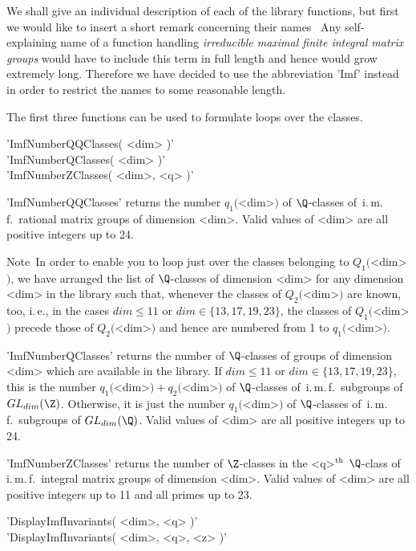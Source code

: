 We shall give an individual description of each of the library functions,
but first we would like to insert a short remark concerning their names\:
\  Any self-explaining  name   of  a function handling  {\em  irreducible
maximal finite integral matrix groups} would have to include this term in
full length  and hence would   grow extremely  long.  Therefore we   have
decided to use  the abbreviation 'Imf' instead in  order  to restrict the
names to some reasonable length.

The  first  three  functions can   be  used to formulate  loops  over the
classes.

\vspace{5mm}
'ImfNumberQQClasses( <dim> )'%
 \\
'ImfNumberQClasses( <dim> )'%
 \\
'ImfNumberZClasses( <dim>, <q> )'%

'ImfNumberQQClasses'  returns the  number  $q_1($<dim>$)$ of $\Q$-classes
of\, i.\,m.\,f.~rational  matrix groups of  dimension <dim>. Valid values
of <dim> are all positive integers up to 24.

Note\:\ In order to enable you to loop just over the classes belonging to
$Q_1($<dim>$)$, we have  arranged the list  of $\Q$-classes of  dimension
<dim> for  any  dimension <dim>  in the library   such that, whenever the
classes of $Q_2($<dim>$)$ are known, too,  i.\,e., in the cases $dim \leq
11$ or  $dim \in \{13,17,19,23\}$,  the classes of $Q_1($<dim>$)$ precede
those of $Q_2($<dim>$)$ and hence are numbered from 1 to $q_1($<dim>$)$.

'ImfNumberQClasses'  returns the  number   of $\Q$-classes  of  groups of
dimension <dim> which are available in  the library. If  $dim \leq 11$ or
$dim  \in    \{13,17,19,23\}$, this   is   the number    $q_1($<dim>$)  +
q_2($<dim>$)$   of     $\Q$-classes  of\,      i.\,m.\,f.~subgroups    of
$GL_{dim}(\Z)$.   Otherwise, it  is   just the number   $q_1($<dim>$)$ of
$\Q$-classes of\, i.\,m.\,f.~subgroups of $GL_{dim}(\Q)$. Valid values of
<dim> are all positive integers up to 24.

'ImfNumberZClasses' returns the number of  $\Z$-classes in the  <q>$^{\rm
th}$  $\Q$-class   of\, i.\,m.\,f.~integral matrix    groups of dimension
<dim>. Valid values of <dim> are  all positive integers up  to 11 and all
primes up to 23.

\vspace{5mm}
'DisplayImfInvariants( <dim>, <q> )'%
 \\
'DisplayImfInvariants( <dim>, <q>, <z> )'

